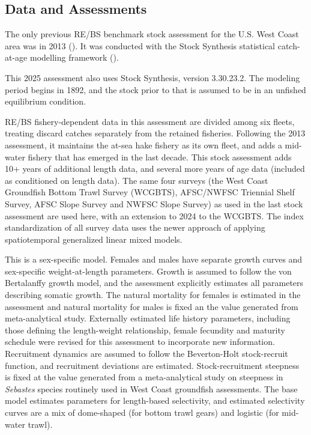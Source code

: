 \documentclass[
]{scrartcl}
\begin{document}
\subsection*{Data and Assessments}\label{data-and-assessments}

The only previous RE/BS benchmark stock assessment for the U.S. West
Coast area was in 2013 (). It was conducted with the Stock Synthesis statistical
catch-at-age modelling framework ().

This 2025 assessment also uses Stock Synthesis, version 3.30.23.2. The
modeling period begins in 1892, and the stock prior to that is assumed
to be in an unfished equilibrium condition.

RE/BS fishery-dependent data in this assessment are divided among six
fleets, treating discard catches separately from the retained fisheries.
Following the 2013 assessment, it maintains the at-sea hake fishery as
its own fleet, and adds a mid-water fishery that has emerged in the last
decade. This stock assessment adds 10+ years of additional length data,
and several more years of age data (included as conditioned on length
data). The same four surveys (the West Coast Groundfish Bottom Trawl
Survey (WCGBTS), AFSC/NWFSC Triennial Shelf Survey, AFSC Slope Survey
and NWFSC Slope Survey) as used in the last stock assessment are used
here, with an extension to 2024 to the WCGBTS. The index standardization
of all survey data uses the newer approach of applying spatiotemporal
generalized linear mixed models.

This is a sex-specific model. Females and males have separate growth
curves and sex-specific weight-at-length parameters. Growth is assumed
to follow the von Bertalanffy growth model, and the assessment
explicitly estimates all parameters describing somatic growth. The
natural mortality for females is estimated in the assessment and natural
mortality for males is fixed an the value generated from meta-analytical
study. Externally estimated life history parameters, including those
defining the length-weight relationship, female fecundity and maturity
schedule were revised for this assessment to incorporate new
information. Recruitment dynamics are assumed to follow the
Beverton-Holt stock-recruit function, and recruitment deviations are
estimated. Stock-recruitment steepness is fixed at the value generated
from a meta-analytical study on steepness in \emph{Sebastes} species
routinely used in West Coast groundfish assessments. The base model
estimates parameters for length-based selectivity, and estimated
selectivity curves are a mix of dome-shaped (for bottom trawl gears) and
logistic (for mid-water trawl).
\end{document}
